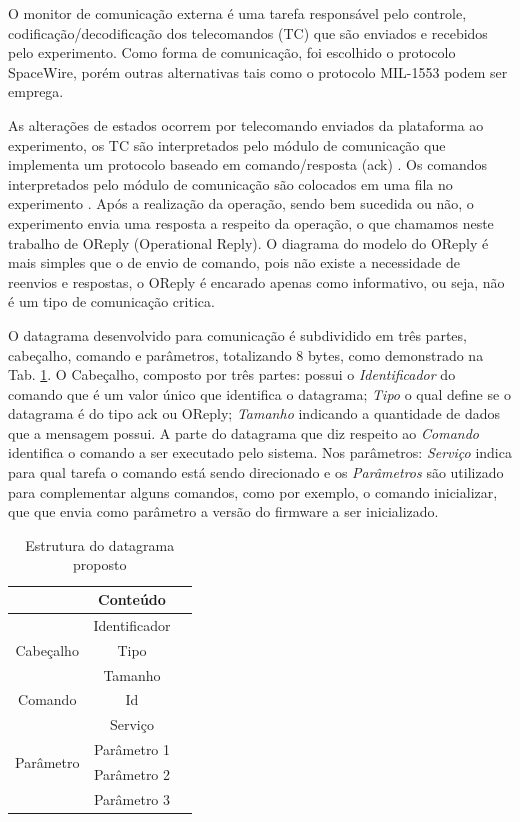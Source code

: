 \documentclass[journal,a4paper,oneside,twocolumn]{IEEEtran}
\begin{document}
	O monitor de comunicação externa é uma tarefa responsável pelo controle, codificação/decodificação dos telecomandos (TC) que são enviados e recebidos pelo experimento. Como forma de comunicação, foi escolhido o protocolo SpaceWire, porém outras alternativas tais como o protocolo MIL-1553 \cite{mil1553} podem ser emprega.
	
	As alterações de estados ocorrem por telecomando enviados da plataforma ao experimento,  os TC são interpretados pelo módulo de comunicação que implementa um protocolo baseado em comando/resposta (ack) . Os comandos interpretados pelo módulo de comunicação são colocados em uma fila no experimento . Após a	realização da operação, sendo bem sucedida ou não, o experimento envia uma resposta a	respeito da operação, o que chamamos neste trabalho de OReply (Operational Reply). O diagrama do modelo do OReply é mais simples que o de envio de comando, pois não existe a	necessidade de reenvios e respostas, o OReply é encarado apenas como informativo, ou seja,	não é um tipo de comunicação critica.
	
	O datagrama desenvolvido para comunicação é subdividido em três partes, cabeçalho, comando e parâmetros, totalizando 8 bytes, como demonstrado na Tab. \ref{tab:datagrama}. O Cabeçalho, composto por três partes: possui o \textit{Identificador} do comando que é um valor único que identifica o datagrama; \textit{Tipo} o qual define se o datagrama é do tipo ack ou OReply; \textit{Tamanho} indicando a quantidade de dados que a mensagem possui. A parte do datagrama que diz respeito ao \textit{Comando} identifica o comando a ser executado pelo sistema. Nos parâmetros: \textit{Serviço} indica para qual tarefa o comando está sendo direcionado e os \textit{Parâmetros} são utilizado para complementar alguns comandos, como por exemplo, o comando inicializar, que que envia como parâmetro a versão do firmware a ser inicializado.
	
	
	
\begin{table}[!t]
\centering
		\begin{tabular}{ c c c}
			 & Conteúdo  \\
			\hline 
			
			\multirow{3}{*}{Cabeçalho} 
			& Identificador \\  
			& Tipo \\  
			& Tamanho \\
			
			\multirow{1}{*}{Comando} 
			& Id \\  
			
			\multirow{4}{*}{Parâmetro} 
			& Serviço \\  
			& Parâmetro 1 \\  
			& Parâmetro 2 \\  
			& Parâmetro 3 \\  
			
			\end{tabular} 
			\caption{Estrutura do datagrama proposto}
			\label{tab:datagrama}
\end{table}
\end{document}
